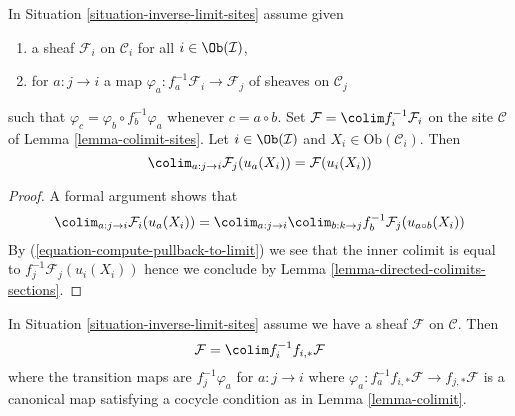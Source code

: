 \begin{lemma}
\label{lemma-colimit}
In Situation \ref{situation-inverse-limit-sites} assume given
\begin{enumerate}
\item a sheaf $\mathcal{F}_i$ on $\mathcal{C}_i$ for all
$i \in \Ob(\mathcal{I})$,
\item for $a : j \to i$ a map
$\varphi_a : f_a^{-1}\mathcal{F}_i \to \mathcal{F}_j$
of sheaves on $\mathcal{C}_j$
\end{enumerate}
such that $\varphi_c = \varphi_b \circ f_b^{-1}\varphi_a$
whenever $c = a \circ b$. Set $\mathcal{F} = \colim f_i^{-1}\mathcal{F}_i$
on the site $\mathcal{C}$ of Lemma \ref{lemma-colimit-sites}.
Let $i \in \Ob(\mathcal{I})$ and $X_i \in \text{Ob}(\mathcal{C}_i)$. Then
$$
\colim_{a : j \to i} \mathcal{F}_j(u_a(X_i)) = \mathcal{F}(u_i(X_i))
$$
\end{lemma}

\begin{proof}
A formal argument shows that
$$
\colim_{a : j \to i} \mathcal{F}_i(u_a(X_i)) =
\colim_{a : j \to i} \colim_{b : k \to j}
f_b^{-1}\mathcal{F}_j(u_{a \circ b}(X_i))
$$
By (\ref{equation-compute-pullback-to-limit})
we see that the inner colimit is equal to
$f_j^{-1}\mathcal{F}_j(u_i(X_i))$ hence we conclude by
Lemma \ref{lemma-directed-colimits-sections}.
\end{proof}

\begin{lemma}
\label{lemma-colimit-push-pull}
In Situation \ref{situation-inverse-limit-sites} assume
we have a sheaf $\mathcal{F}$ on $\mathcal{C}$. Then
$$
\mathcal{F} = \colim f_i^{-1}f_{i, *}\mathcal{F}
$$
where the transition maps are $f_j^{-1}\varphi_a$
for $a : j \to i$ where
$\varphi_a : f_a^{-1}f_{i, *}\mathcal{F} \to f_{j, *}\mathcal{F}$
is a canonical map
satisfying a cocycle condition as in Lemma \ref{lemma-colimit}.
\end{lemma}

